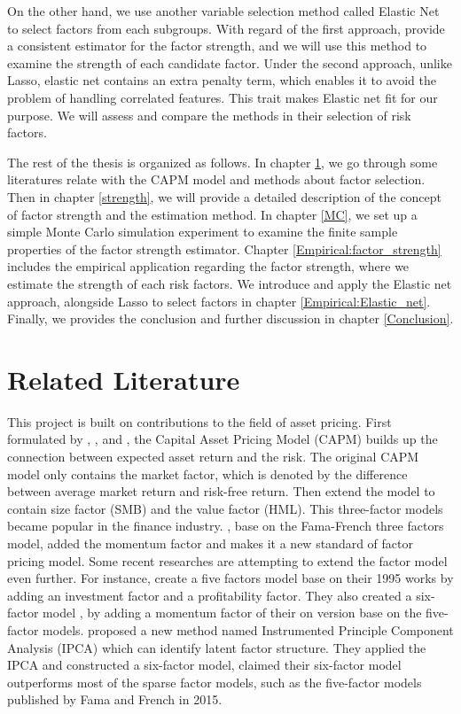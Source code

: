 On the other hand, we use another variable selection method called Elastic Net \cite{Zou2005} to select factors from each subgroups.
With regard of the first approach,  provide a consistent estimator for the factor strength, and we will use this method to examine the strength of each candidate factor.
Under the second approach, unlike Lasso, elastic net contains an extra penalty term, which enables it to avoid the problem of handling correlated features.
This trait makes Elastic net fit for our purpose.
We will assess and compare the methods in their selection of risk factors.

The rest of the thesis is organized as follows.
In chapter \ref{Literature}, we go through some literatures relate with the CAPM model and methods about factor selection.
Then in chapter \ref{strength}, we will provide a detailed description of the concept of factor strength and the estimation method.
In chapter \ref{MC}, we set up a simple Monte Carlo simulation experiment to examine the finite sample properties of the factor strength estimator.
Chapter \ref{Empirical:factor_strength} includes the empirical application regarding the factor strength, where we estimate the strength of each risk factors.
We introduce and apply the Elastic net approach, alongside Lasso to select factors in chapter \ref{Empirical:Elastic_net}.
Finally, we provides the conclusion and further discussion in chapter \ref{Conclusion}.


	\chapter{Related Literature}\label{Literature}
This project is built on contributions to the field of asset pricing.
First formulated by , , and , the Capital Asset Pricing Model (CAPM) builds up the connection between expected asset return and the risk.
The original CAPM model only contains the market factor, which is denoted by the difference between average market return and risk-free return.
Then extend the model to contain size factor (SMB) and the value factor (HML).
This three-factor models became popular in the finance industry.
, base on the Fama-French three factors model, added the momentum factor and makes it a new standard of factor pricing model.
Some recent researches are attempting to extend the factor model even further.
For instance,  create a five factors model base on their 1995 works by adding an investment factor and a profitability factor.
They also created a six-factor model \cite{Fama2018}, by adding a momentum factor of their on version base on the five-factor models.
 proposed a new method named Instrumented Principle Component Analysis (IPCA) which can identify latent factor structure.
They applied the IPCA and constructed a six-factor model, claimed their six-factor model outperforms most of the sparse factor models, such as the five-factor models published by Fama and French in 2015.

